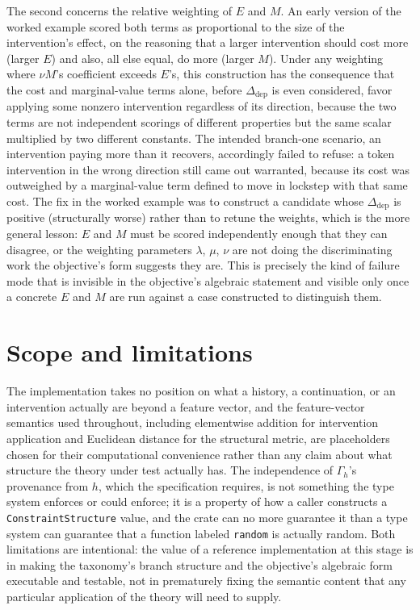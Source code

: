 \documentclass[11pt]{article}
\begin{document}
The second concerns the relative weighting of $E$ and $M$. An early version of the worked example scored both terms as proportional to the size of the intervention's effect, on the reasoning that a larger intervention should cost more (larger $E$) and also, all else equal, do more (larger $M$). Under any weighting where $\nu M$'s coefficient exceeds $E$'s, this construction has the consequence that the cost and marginal-value terms alone, before $\Delta_{\text{dep}}$ is even considered, favor applying some nonzero intervention regardless of its direction, because the two terms are not independent scorings of different properties but the same scalar multiplied by two different constants. The intended branch-one scenario, an intervention paying more than it recovers, accordingly failed to refuse: a token intervention in the wrong direction still came out warranted, because its cost was outweighed by a marginal-value term defined to move in lockstep with that same cost. The fix in the worked example was to construct a candidate whose $\Delta_{\text{dep}}$ is positive (structurally worse) rather than to retune the weights, which is the more general lesson: $E$ and $M$ must be scored independently enough that they can disagree, or the weighting parameters $\lambda$, $\mu$, $\nu$ are not doing the discriminating work the objective's form suggests they are. This is precisely the kind of failure mode that is invisible in the objective's algebraic statement and visible only once a concrete $E$ and $M$ are run against a case constructed to distinguish them.

\section{Scope and limitations}

The implementation takes no position on what a history, a continuation, or an intervention actually are beyond a feature vector, and the feature-vector semantics used throughout, including elementwise addition for intervention application and Euclidean distance for the structural metric, are placeholders chosen for their computational convenience rather than any claim about what structure the theory under test actually has. The independence of $\Gamma_h$'s provenance from $h$, which the specification requires, is not something the type system enforces or could enforce; it is a property of how a caller constructs a \texttt{ConstraintStructure} value, and the crate can no more guarantee it than a type system can guarantee that a function labeled \texttt{random} is actually random. Both limitations are intentional: the value of a reference implementation at this stage is in making the taxonomy's branch structure and the objective's algebraic form executable and testable, not in prematurely fixing the semantic content that any particular application of the theory will need to supply.
\end{document}

